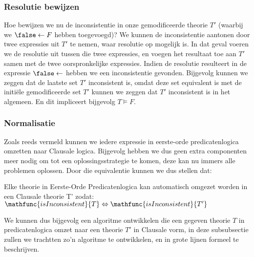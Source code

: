 \subsubsection{Resolutie bewijzen}
\label{sss:resolutionProof}
Hoe bewijzen we nu de inconsistentie in onze gemodificeerde theorie $T'$ (waarbij we $\false\leftarrow F$ hebben toegevoegd)? We kunnen de inconsistentie aantonen door twee expressies uit $T'$ te nemen, waar resolutie op mogelijk is. In dat geval voeren we de resolutie uit tussen die twee expressies, en voegen het resultaat toe aan $T'$ samen met de twee oorspronkelijke expressies. Indien de resolutie resulteert in de expressie $\false\leftarrow$ hebben we een inconsistentie gevonden. Bijgevolg kunnen we zeggen dat de laatste set $T'$ inconsistent is, omdat deze set equivalent is met de initi\"ele gemodificeerde set $T'$ kunnen we zeggen dat $T'$ inconsistent is in het algemeen. En dit impliceert bijgevolg $T\vDash F$.
\subsubsection{Normalisatie}
\label{sss:normalisation}
Zoals reeds vermeld kunnen we iedere expressie in eerste-orde predicatenlogica omzetten naar Clausale logica. Bijgevolg hebben we dus geen extra componenten meer nodig om tot een oplossingsstrategie te komen, deze kan nu immers alle problemen oplossen. Door die equivalentie kunnen we dus stellen dat:
\begin{theorem}
Elke theorie in Eerste-Orde Predicatenlogica kan automatisch omgezet worden in een Clausale theorie T' zodat: $\mathfunc{isInconsistent}{T}\Leftrightarrow\mathfunc{isInconsistent}{T'}$
\end{theorem}
We kunnen dus bijgevolg een algoritme ontwikkelen die een gegeven theorie $T$ in predicatenlogica omzet naar een theorie $T'$ in Clausale vorm, in deze subsubsectie zullen we trachtten zo'n algoritme te ontwikkelen, en in grote lijnen formeel te beschrijven.
